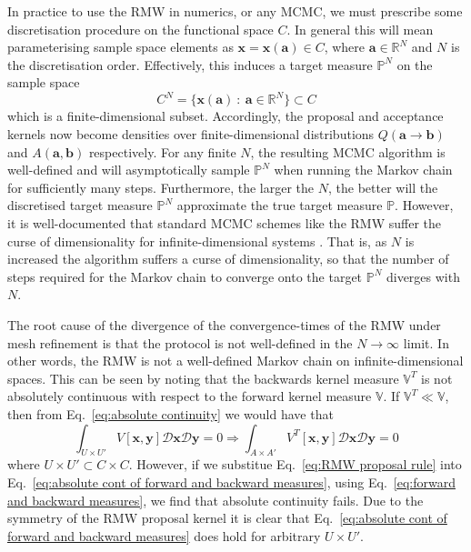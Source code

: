 

In practice to use the RMW in numerics, or any MCMC, we must prescribe some discretisation procedure on the functional space $C$. In general this will mean parameterising sample space elements as $\mathbf{x} = \mathbf{x}(\mathbf{a}) \in C$, where $\mathbf{a} \in \mathbb{R}^N$ and $N$ is the discretisation order. Effectively, this induces a target measure $\mathbb{P}^N$ on the sample space
\begin{equation}
	C^N = \{ \mathbf{x}(\mathbf{a})\ :\ \mathbf{a} \in \mathbb{R}^N \} \subset C
\end{equation}
which is a finite-dimensional subset. Accordingly, the proposal and acceptance kernels now become densities over finite-dimensional distributions $Q(\mathbf{a} \to \mathbf{b})$ and $A(\mathbf{a}, \mathbf{b})$ respectively. For any finite $N$, the resulting MCMC algorithm is well-defined and will asymptotically sample $\mathbb{P}^N$ when running the Markov chain for sufficiently many steps. Furthermore, the larger the $N$, the better will the discretised target measure $\mathbb{P}^N$ approximate the true target measure $\mathbb{P}$. However, it is well-documented that standard MCMC schemes like the RMW suffer the curse of dimensionality for infinite-dimensional systems \citep{cotterMCMCMethodsFunctions2013, hairerSpectralGapsMetropolis2014}. That is, as $N$ is increased the algorithm suffers a curse of dimensionality, so that the number of steps required for the Markov chain to converge onto the target $\mathbb{P}^N$ diverges with $N$.

The root cause of the divergence of the convergence-times of the RMW under mesh refinement is that the protocol is not well-defined in the $N \to \infty$ limit. In other words, the RMW is not a well-defined Markov chain on infinite-dimensional spaces. This can be seen by noting that the backwards kernel measure $\mathbb{V}^T$ is not absolutely continuous with respect to the forward kernel measure $\mathbb{V}$. If $\mathbb{V}^T \ll \mathbb{V}$, then from Eq.~\ref{eq:absolute continuity} we would have that
\begin{equation} \label{eq:absolute cont of forward and backward measures}
	\int_{U \times U'} V[\mathbf{x}, \mathbf{y}] \mathcal{D}\mathbf{x} \mathcal{D}\mathbf{y} = 0 \Rightarrow  \int_{A \times A'} V^T[\mathbf{x}, \mathbf{y}] \mathcal{D}\mathbf{x} \mathcal{D}\mathbf{y} = 0
\end{equation}
where $U \times U' \subset C \times C$. However, if we substitue Eq.~\ref{eq:RMW proposal rule} into Eq.~\ref{eq:absolute cont of forward and backward measures}, using Eq.~\ref{eq:forward and backward measures}, we find that absolute continuity fails. Due to the symmetry of the RMW proposal kernel it is clear that Eq.~\ref{eq:absolute cont of forward and backward measures} does hold for arbitrary $U \times U'$.

